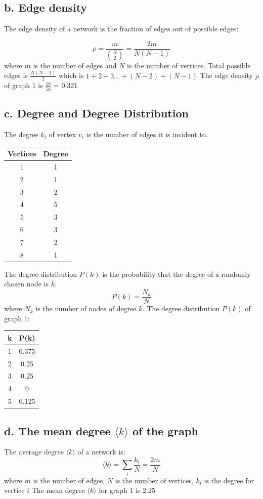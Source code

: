 \documentclass[a4paper,12pt]{article}
\begin{document}
\subsection*{b. Edge density}
The edge density of a network is the fraction of edges out of possible edges:

$$\rho = \frac{m}{{N\choose 2}} = \frac{2m}{N(N-1)}$$
where $m$ is the number of edges and $N$ is the number of vertices.
\newline Total possible edges is
$\frac{N(N-1)}{2}$ which is $1 + 2 + 3 ... + (N-2) + (N-1)$
\newline \newline
The edge density $\rho$ of graph 1 is $\frac{18}{56}$ = 0.321

\subsection*{c. Degree and Degree Distribution}
The degree $k_i$ of vertex $v_i$ is the number of edges it is incident to.\newline
\begin{table}[h]
\centering
\begin{tabular}{c|c}
Vertices & Degree\\
\hline
1 & 1\\
2 & 1\\
3 & 2\\
4 & 5\\
5 & 3\\
6 & 3\\
7 & 2\\
8 & 1
\end{tabular}
\end{table}
\break
The degree distribution $P(k)$ is the probability that the degree of a randomly chosen node is $k$.
$$P(k) = \frac{N_k}{N}$$
where $N_k$ is the number of nodes of degree $k$.\newline\newline
The degree distribution $P(k)$ of graph 1: 
\begin{table}[h]
\centering
\begin{tabular}{c|c}
k & P(k)\\
\hline
1 & 0.375\\
2 & 0.25\\
3 & 0.25\\
4 & 0\\
5 & 0.125
\end{tabular}
\end{table}
\subsection*{d. The mean degree $\langle k \rangle$ of the graph}
The average degree $\langle k \rangle$ of a network is:
$$\langle k \rangle = \sum_{i}\frac{k_i}{N} = \frac{2m}{N}$$
where $m$ is the number of edges, $N$ is the number of vertices, $k_i$ is the degree for vertice $i$\newline\newline
The mean degree $\langle k \rangle$ for graph 1 is 2.25
\end{document}

